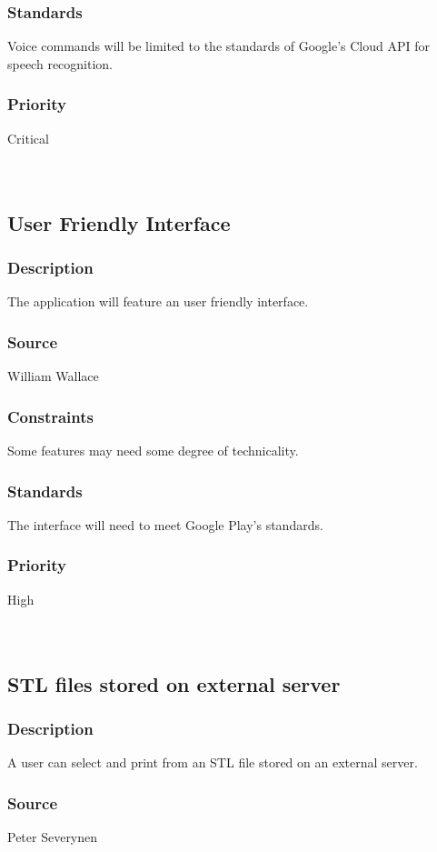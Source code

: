 \subsubsection{Standards}
Voice commands will be limited to the standards of Google's Cloud API for speech recognition. \cite{developers.google}
\subsubsection{Priority}
Critical\\
\\
\\
\subsection{User Friendly Interface}
\subsubsection{Description}
The application will feature an user friendly interface.
\subsubsection{Source}
William Wallace
\subsubsection{Constraints}
Some features may need some degree of technicality. 
\subsubsection{Standards}
The interface will need to meet Google Play's standards.
\subsubsection{Priority}
High\\
\\
\\
\subsection{STL files stored on external server}
\subsubsection{Description}
A user can select and print from an STL file stored on an external server.
\subsubsection{Source}
Peter Severynen
